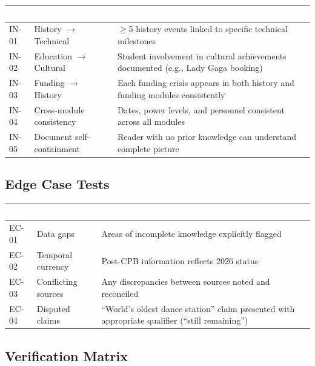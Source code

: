 \documentclass[11pt,letterpaper]{article}
\newcommand{\tableheader}[1]{\textbf{\sffamily\textcolor{white}{#1}}}
\begin{document}
\begin{center}
\begin{tabularx}{\textwidth}{C{1.2cm}L{3cm}X}
\toprule
{}
\tableheader{ID} & \tableheader{Verifies} & \tableheader{Expected Behavior} \\
\midrule
IN-01 & History $\rightarrow$ Technical & $\geq$5 history events linked to specific technical milestones \\
IN-02 & Education $\rightarrow$ Cultural & Student involvement in cultural achievements documented (e.g., Lady Gaga booking) \\
IN-03 & Funding $\rightarrow$ History & Each funding crisis appears in both history and funding modules consistently \\
IN-04 & Cross-module consistency & Dates, power levels, and personnel consistent across all modules \\
IN-05 & Document self-containment & Reader with no prior knowledge can understand complete picture \\
\bottomrule
\end{tabularx}
\end{center}

\subsection{Edge Case Tests}

\begin{center}
\begin{tabularx}{\textwidth}{C{1.2cm}L{3cm}X}
\toprule
{}
\tableheader{ID} & \tableheader{Verifies} & \tableheader{Expected Behavior} \\
\midrule
EC-01 & Data gaps & Areas of incomplete knowledge explicitly flagged \\
EC-02 & Temporal currency & Post-CPB information reflects 2026 status \\
EC-03 & Conflicting sources & Any discrepancies between sources noted and reconciled \\
EC-04 & Disputed claims & ``World's oldest dance station'' claim presented with appropriate qualifier (``still remaining'') \\
\bottomrule
\end{tabularx}
\end{center}

\subsection{Verification Matrix}
\end{document}
